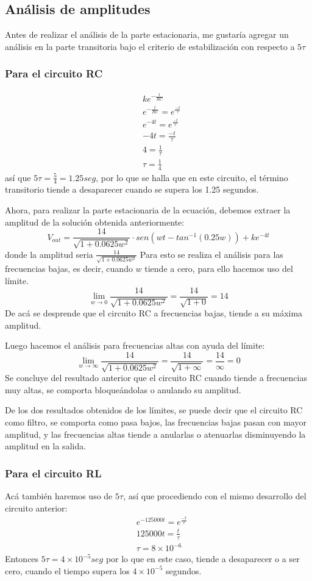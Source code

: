 \documentclass{article}
\begin{document}
\subsection{Análisis de amplitudes}
Antes de realizar el análisis de la parte estacionaria, me gustaría agregar un análisis en la parte transitoria bajo el criterio de estabilización con respecto a \(5\tau
\)
\subsubsection{Para el circuito RC}
\begin{align*}
    &ke^{-\frac{t}{RC}} \\
    &e^{-\frac{t}{RC}}=e^{\frac{-t}{\tau}}\\
    &e^{-4t}=e^{\frac{-t}{\tau}} \\
    &-4t=\frac{-t}{\tau} \\
    &4=\frac{1}{\tau} \\
    &\tau=\frac{1}{4}
\end{align*}
así que \(5\tau=\frac{5}{4}=1.25seg\), por lo que se halla que en este circuito, el término transitorio tiende a desaparecer cuando se supera los 1.25 segundos.

Ahora, para realizar la parte estacionaria de la ecuación, debemos extraer la amplitud de la solución obtenida anteriormente: 
\[
    V_{out}=\frac{14}{\sqrt{1+0.0625w^2}}\cdot sen(wt-tan^{-1}(0.25w))+ke^{-4t}
\]
donde la amplitud seria \(\frac{14}{\sqrt{1+0.0625w^2}}\)
Para esto se realiza el análisis para las frecuencias bajas, es decir, cuando \(w\) tiende a cero, para ello hacemos uso del límite.
\[
    \lim_{w \to 0} \frac{14}{\sqrt{1+0.0625w^2}}=\frac{14}{\sqrt{1+0}}=14
\]
De acá se desprende que el circuito RC a frecuencias bajas, tiende a su máxima amplitud.

Luego hacemos el análisis para frecuencias altas con ayuda del límite:
\[
    \lim_{w \to \infty} \frac{14}{\sqrt{1+0.0625w^2}}=\frac{14}{\sqrt{1+\infty}}=\frac{14}{\infty}=0
\]
Se concluye del resultado anterior que el circuito RC cuando tiende a frecuencias muy altas, se comporta bloqueándolas o anulando su amplitud.

De los dos resultados obtenidos de los límites, se puede decir que el circuito RC como filtro, se comporta como pasa bajos, las frecuencias bajas pasan con mayor amplitud, y las frecuencias altas tiende a anularlas o atenuarlas disminuyendo la amplitud en la salida.
\subsubsection{Para el circuito RL}
Acá también haremos uso de \(5\tau\), así que procediendo con el mismo desarrollo del circuito anterior:
\begin{align*}
    &e^{-125000t}=e^{\frac{-t}{\tau}} \\
    &125000t=\frac{t}{\tau} \\
    &\tau=8 \times10^{-6}
\end{align*}
Entonces \(5\tau=4\times10^{-5}seg\) por lo que en este caso, tiende a desaparecer o a ser cero, cuando el tiempo supera los \(4\times10^{-5}\) segundos.
\end{document}
